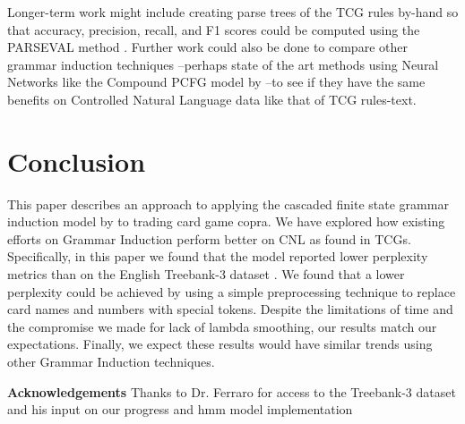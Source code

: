 \documentclass[11pt,a4paper]{article}
\begin{document}
Longer-term work might include creating parse trees of the TCG rules by-hand so that accuracy, precision, recall, and F1 scores could be computed using the PARSEVAL method \citep{black-etal-1991-procedure}. Further work could also be done to compare other grammar induction techniques --perhaps state of the art methods using Neural Networks like the Compound PCFG model by \citet{kim-etal-2019-compound}--to see if they have the same benefits on Controlled Natural Language data like that of TCG rules-text.

\section{Conclusion}
This paper describes an approach to applying the cascaded finite state grammar induction model by \citet{ponvert-etal-2011-simple} to trading card game copra. We have explored how existing efforts on Grammar Induction perform better on CNL as found in TCGs. Specifically, in this paper we found that the model reported lower perplexity metrics than on the English Treebank-3 dataset \citep{treebank_3}. We found that a lower perplexity could be achieved by using a simple preprocessing technique to replace card names and numbers with special tokens. Despite the limitations of time and the compromise we made for lack of lambda smoothing, our results match our expectations. Finally, we expect these results would have similar trends using other Grammar Induction techniques.

\vspace{0.1in}
\noindent \textbf{Acknowledgements} Thanks to Dr. Ferraro for access to the Treebank-3 dataset and his input on our progress and hmm model implementation



\end{document}

